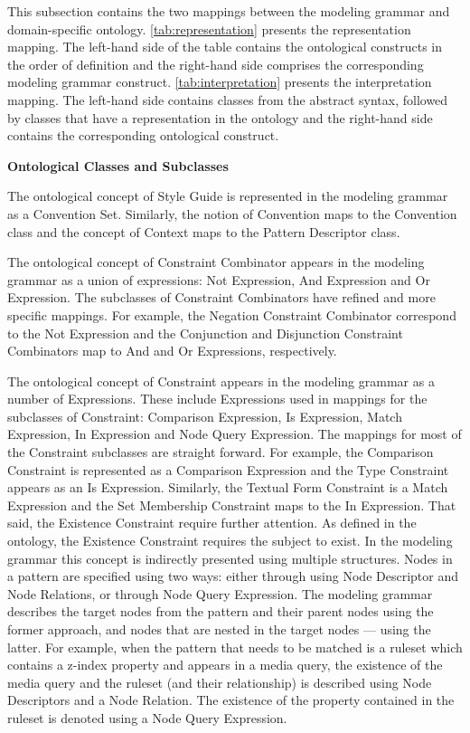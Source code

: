 This subsection contains the two mappings between the modeling grammar and domain-specific ontology.
\autoref{tab:representation} presents the representation mapping. The left-hand side of the table
contains the ontological constructs in the order of definition and the right-hand side comprises the
corresponding modeling grammar construct. \autoref{tab:interpretation} presents the interpretation
mapping. The left-hand side contains classes from the abstract syntax, followed by classes that have
a representation in the ontology and the right-hand side contains the corresponding ontological
construct.




\textbf{Ontological Classes and Subclasses}

The ontological concept of Style Guide is represented in the modeling grammar as a Convention Set.
Similarly, the notion of Convention maps to the Convention class and the concept of Context maps to
the Pattern Descriptor class.

The ontological concept of Constraint Combinator appears in the modeling grammar as a union of
expressions: Not Expression, And Expression and Or Expression. The subclasses of Constraint
Combinators have refined and more specific mappings. For example, the Negation Constraint Combinator
correspond to the Not Expression and the Conjunction and Disjunction Constraint Combinators map to
And and Or Expressions, respectively.

The ontological concept of Constraint appears in the modeling grammar as a number of Expressions.
These include Expressions used in mappings for the subclasses of Constraint: Comparison Expression,
Is Expression, Match Expression, In Expression and Node Query Expression. The mappings for most of
the Constraint subclasses are straight forward. For example, the Comparison Constraint is
represented as a Comparison Expression and the Type Constraint appears as an Is Expression.
Similarly, the Textual Form Constraint is a Match Expression and the Set Membership Constraint maps
to the In Expression. That said, the Existence Constraint require further attention. As defined in
the ontology, the Existence Constraint requires the subject to exist. In the modeling grammar this
concept is indirectly presented using multiple structures. Nodes in a pattern are specified using
two ways: either through using Node Descriptor and Node Relations, or through Node Query Expression.
The modeling grammar describes the target nodes from the pattern and their parent nodes using the
former approach, and nodes that are nested in the target nodes --- using the latter. For example,
when the pattern that needs to be matched is a ruleset which contains a z-index property and appears
in a media query, the existence of the media query and the ruleset (and their relationship) is
described using Node Descriptors and a Node Relation. The existence of the property contained in the
ruleset is denoted using a Node Query Expression.

